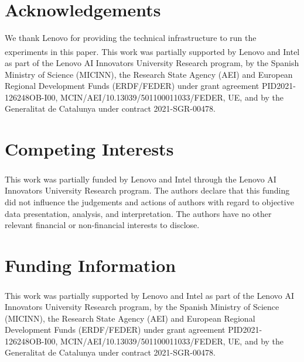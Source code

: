 \documentclass[pdflatex,sn-mathphys-num]{sn-jnl}%
\theoremstyle{thmstyleone}%
\theoremstyle{thmstyletwo}%
\theoremstyle{thmstylethree}%
\begin{document}
\section*{Acknowledgements}

We thank Lenovo for providing the technical infrastructure to run the experiments in this paper. This work was partially supported by Lenovo and Intel\textsuperscript{\textregistered} as part of the Lenovo AI Innovators University Research program, by the Spanish Ministry of Science (MICINN), the Research State Agency (AEI) and European Regional Development Funds (ERDF/FEDER) under grant agreement PID2021-126248OB-I00, MCIN/AEI/10.13039/501100011033/FEDER, UE, and by the Generalitat de Catalunya under contract 2021-SGR-00478.



\section*{Competing Interests}
This work was partially funded by Lenovo and Intel\textsuperscript{\textregistered} through the Lenovo AI Innovators University Research program. The authors declare that this funding did not influence the judgements and actions of authors with regard to objective data presentation, analysis, and interpretation. The authors have no other relevant financial or non-financial interests to disclose.

\section*{Funding Information}
This work was partially supported by Lenovo and Intel\textsuperscript{\textregistered} as part of the Lenovo AI Innovators University Research program, by the Spanish Ministry of Science (MICINN), the Research State Agency (AEI) and European Regional Development Funds (ERDF/FEDER) under grant agreement PID2021-126248OB-I00, MCIN/AEI/10.13039/501100011033/FEDER, UE, and by the Generalitat de Catalunya under contract 2021-SGR-00478.
\end{document}
